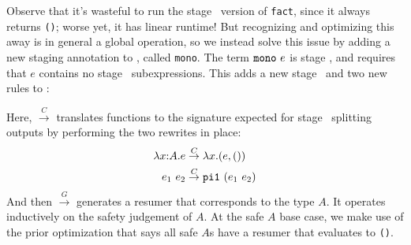 Observe that it's wasteful to run the stage \bbtwo\ version of \texttt{fact}, since it
always returns \texttt{()}; worse yet, it has linear runtime!
But recognizing and optimizing this away is in general a global operation,
so we instead solve this issue by adding a new staging annotation to \lang, called
\texttt{mono}. The term ${\tt mono}~e$ is stage \bbone, and requires that $e$ contains
no stage \bbtwo\ subexpressions. This adds a new stage \bbmono\ and two new
rules to \lang:
Here, $\overset{C}{\rightarrow}$ translates functions to the signature expected for stage \bbone\ splitting outputs
by performing the two rewrites in place:
\begin{align*}
\lambda{x}\mathrm{:}{A}.{e} &\overset{C}{\rightarrow} \lambda x.(e,())\\
e_1~e_2 &\overset{C}{\rightarrow} {\tt pi1}~(e_1~e_2)
\end{align*}
And then $\overset{G}{\rightarrow}$ generates a resumer that corresponds to the type $A$.
It operates inductively on the safety judgement of $A$.
At the safe $A$ base case, we make use of the prior optimization that says all safe $A$s have a resumer that evaluates to \texttt{()}.
